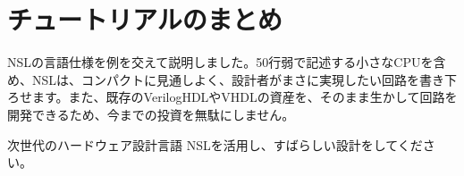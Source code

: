 \chapter{チュートリアルのまとめ}
\label{chap:conclusion}

NSLの言語仕様を例を交えて説明しました。50行弱で記述する小さなCPUを含め、NSLは、コンパクトに見通しよく、設計者がまさに実現したい回路を書き下ろせます。また、既存のVerilogHDLやVHDLの資産を、そのまま生かして回路を開発できるため、今までの投資を無駄にしません。

次世代のハードウェア設計言語 NSLを活用し、すばらしい設計をしてください。
